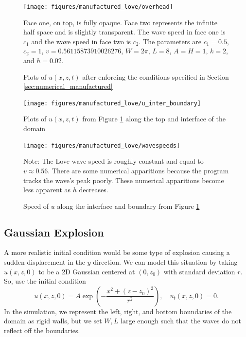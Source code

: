 \documentclass[11pt,letter,subeqn,fleqn]{article}
\numberwithin{equation}{section}
\numberwithin{table}{section}
\numberwithin{figure}{section}
\begin{document}
\begin{figure}[htbp]
	\caption{Plots of $u(x,z,t)$ after enforcing the conditions specified in Section \ref{sec:numerical_manufactured}}
	\label{fig:manufacturedLove}
	\texttt{[image: figures/manufactured\_love/overhead]}
\footnotesize
\centering

Face one, on top, is fully opaque. Face two represents the infinite half space and is slightly transparent. The wave speed in face one is $c_1$ and the wave speed in face two is $c_2$. The parameters are $c_1 = 0.5$, $c_2 = 1$, $v=0.56115873910026276$, $W=2\pi$, $L=8$, $A=H=1$, $k=2$, and $h = 0.02$.
\end{figure}

\begin{figure}[htbp]
	\caption{Plots of $u(x,z,t)$ from Figure \ref{fig:manufacturedLove} along the top and interface of the domain}
	\label{fig:manufactured1Dwaves}
	\texttt{[image: figures/manufactured\_love/u\_inter\_boundary]}
\footnotesize
\centering
\end{figure}

\begin{figure}[htbp]
	\caption{Speed of $u$ along the interface and boundary from Figure \ref{fig:manufacturedLove}}
	\label{fig:manufactured1Dspeeds}
	\texttt{[image: figures/manufactured\_love/wavespeeds]}
\footnotesize
\centering

Note: The Love wave speed is roughly constant and equal to $v\approx0.56$. There are some
numerical apparitions because the program tracks the wave's peak poorly. These numerical apparitions
become less apparent as $h$ decreases.
\end{figure}





\subsection{Gaussian Explosion}
A more realistic initial condition would be some type of explosion causing a sudden displacement in the $y$
direction. We can model this situation by taking $u(x,z,0)$ to be a $2$D Gaussian centered at $(0,z_0)$ with
standard deviation $r$. So, use the initial condition
\[
	u(x,z,0) = A\exp\left(-\frac{x^2+(z-z_0)^2}{r^2}\right), \quad u_t(x,z,0) = 0.
\]
In the simulation, we represent the left, right, and bottom boundaries of the domain as rigid walls, but
we set $W,L$ large enough such that the waves do not reflect off the boundaries.
\end{document}
